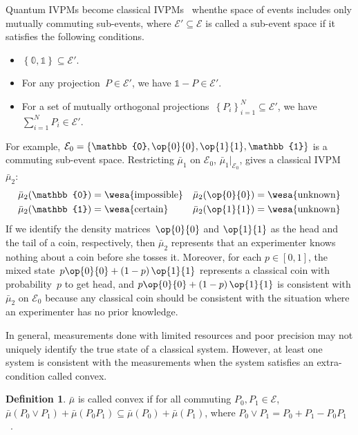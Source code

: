\documentclass[english,reprint, aps, prl,superscriptaddress, showpacs,
showkeys, longbibliography, amsmath, amssymb]{revtex4-1}
\theoremstyle{plain}
\theoremstyle{definition}
\newtheorem{definition}[thm]{Definition}
\newcommand{\events}{\ensuremath{\mathcal{E}}}
\newcommand{\imposs}{{\text{\wesa{impossible}}}}
\newcommand{\necess}{{\text{\wesa{certain}}}}
\newcommand{\unknown}{{\text{\wesa{unknown}}}}
\newcommand{\proj}[1]{\op{#1}{#1}}
\begin{document}
Quantum IVPMs become classical IVPMs~\cite{JamisonLodwick2004} whenthe space of events includes only mutually commuting sub-events, where
$\events'\subseteq\events$ is called a sub-event space if it satisfies
the following conditions.
\begin{itemize}
\item $\left\{ \mathbb{0},\mathbb{1}\right\} \subseteq\events'$.
\item For any projection~$P\in\events'$, we have $\mathbb{1}-P\in\events'$. 
\item For a set of mutually orthogonal projections~$\left\{ P_{i}\right\} _{i=1}^{N}\subseteq\events'$,
we have $\sum_{i=1}^{N}P_{i}\in\events'$. 
\end{itemize}
For example, $\events_{0}=\left\{ \mathbb{0},\proj{0},\proj{1},\mathbb{1}\right\} $
is a commuting sub-event space. Restricting $\bar{\mu}_{1}$ on $\events_{0}$,
$\bar{\mu}_{1}|_{\events_{0}}$, gives a classical IVPM~$\bar{\mu}_{2}$:
\begin{equation}
\begin{aligned}\bar{\mu}_{2}(\mathbb{0}) & =\imposs & \bar{\mu}_{2}(\proj{0}) & =\unknown\\
\bar{\mu}_{2}(\mathbb{1}) & =\necess & \bar{\mu}_{2}(\proj{1}) & =\unknown
\end{aligned}
\end{equation}
If we identify the density matrices~$\proj{0}$ and $\proj{1}$ as
the head and the tail of a coin, respectively, then $\bar{\mu}_{2}$
represents that an experimenter knows nothing about a coin before
she tosses it. Moreover, for each $p\in\left[0,1\right]$, the mixed
state~$p\proj{0}+\left(1-p\right)\proj{1}$ represents a classical
coin with probability~$p$ to get head, and $p\proj{0}+\left(1-p\right)\proj{1}$
is consistent with $\bar{\mu}_{2}$ on $\events_{0}$ because any
classical coin should be consistent with the situation where an experimenter
has no prior knowledge.

In general, measurements done with limited resources and poor precision
may not uniquely identify the true state of a classical system. However,
at least one system is consistent with the measurements when the system
satisfies an extra-condition called convex.

\begin{definition}
$\bar{\mu}$ is called convex if for all commuting $P_{0},P_{1}\in\events$,
$\bar{\mu}\left(P_{0}\vee P_{1}\right)+\bar{\mu}\left(P_{0}P_{1}\right)\subseteq\bar{\mu}\left(P_{0}\right)+\bar{\mu}\left(P_{1}\right)$,
where $P_{0}\vee P_{1}=P_{0}+P_{1}-P_{0}P_{1}$~\cite{Griffiths2003}.
\end{definition}
\end{document}

